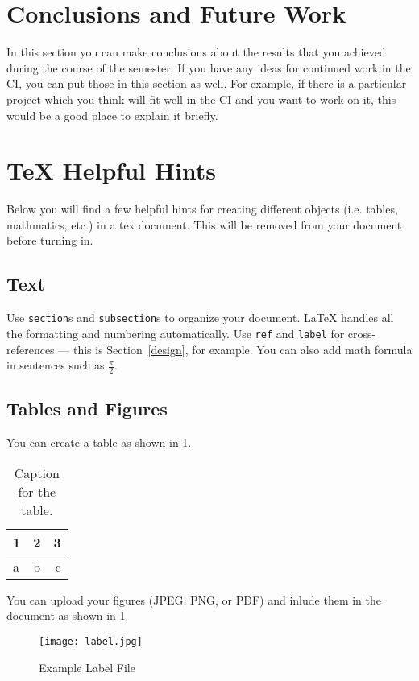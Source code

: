 \section{Conclusions and Future Work}

In this section you can make conclusions about the results that you achieved during the course of the semester.  If you have any ideas for continued work in the CI, you can put those in this section as well.  For example, if there is a particular project which you think will fit well in the CI and you want to work on it, this would be a good place to explain it briefly.

\section*{TeX Helpful Hints}\label{design}

Below you will find a few helpful hints for creating different objects (i.e. tables, mathmatics, etc.) in a tex document.  This will be removed from your document before turning in.

\subsection*{Text}

Use \texttt{section}s and \texttt{subsection}s to organize your document. \LaTeX{} handles all the formatting and numbering automatically. Use \texttt{ref} and \texttt{label} for cross-references --- this is Section~\ref{design}, for example.
You can also add math formula in sentences such as $\frac{\pi}{2}$.
\subsection*{Tables and Figures}
You can create a table as shown in \ref{tab:table1}.
\begin{table}
	\centering
	\caption{Caption for the table.}
	\label{tab:table1}
	\begin{tabular}{l|c||r}
		\hline
		1 & 2 & 3\\
		\hline
		a & b & c\\
		\hline
	\end{tabular}
\end{table}

You can upload your figures (JPEG, PNG, or PDF) and inlude them in the document as shown in \ref{fig:your-figure}.

\begin{figure}[h!]
\texttt{[image: label.jpg]}
\caption{\label{fig:your-figure}Example Label File}
\end{figure}

